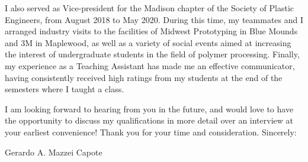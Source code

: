 \documentclass[12pt,letterpaper]{article}
\begin{document}
I also served as Vice-president for the Madison chapter of the Society of Plastic Engineers, from August 2018 to May 2020. During this time, my teammates and I arranged industry visits to the facilities of Midwest Prototyping in Blue Mounds and 3M in Maplewood, as well as a variety of social events aimed at increasing the interest of undergraduate students in the field of polymer processing. Finally, my experience as a Teaching Assistant has made me an effective communicator, having consistently received high ratings from my students at the end of the semesters where I taught a class.	 

I am looking forward to hearing from you in the future, and would love to have the opportunity to discuss my qualifications in more detail over an interview at your earliest convenience! Thank you for your time and consideration. 
Sincerely: 
\\
\begin{center}
Gerardo A. Mazzei Capote
\end{center}
\end{document}
